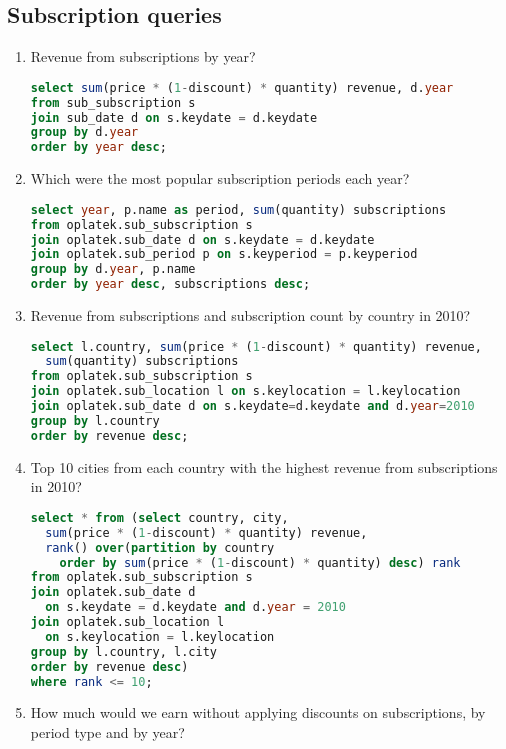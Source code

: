 \subsection*{Subscription queries} %
\label{sub:Subscription business queries}
\begin{enumerate}
  \item Revenue from subscriptions by year?
\begin{lstlisting}[language=sql]
select sum(price * (1-discount) * quantity) revenue, d.year 
from sub_subscription s 
join sub_date d on s.keydate = d.keydate 
group by d.year 
order by year desc;
\end{lstlisting}
  \item Which were the most popular subscription periods each year?
\begin{lstlisting}[language=sql]
select year, p.name as period, sum(quantity) subscriptions
from oplatek.sub_subscription s 
join oplatek.sub_date d on s.keydate = d.keydate
join oplatek.sub_period p on s.keyperiod = p.keyperiod 
group by d.year, p.name
order by year desc, subscriptions desc;
\end{lstlisting}
  \item Revenue from subscriptions and subscription count by country in 2010?
\begin{lstlisting}[language=sql]
select l.country, sum(price * (1-discount) * quantity) revenue, 
  sum(quantity) subscriptions 
from oplatek.sub_subscription s 
join oplatek.sub_location l on s.keylocation = l.keylocation 
join oplatek.sub_date d on s.keydate=d.keydate and d.year=2010
group by l.country 
order by revenue desc;
\end{lstlisting}
  \item Top 10 cities from each country with the highest revenue from subscriptions in 2010?
\begin{lstlisting}[language=sql]  
select * from (select country, city, 
  sum(price * (1-discount) * quantity) revenue, 
  rank() over(partition by country 
    order by sum(price * (1-discount) * quantity) desc) rank 
from oplatek.sub_subscription s 
join oplatek.sub_date d 
  on s.keydate = d.keydate and d.year = 2010
join oplatek.sub_location l 
  on s.keylocation = l.keylocation
group by l.country, l.city
order by revenue desc)
where rank <= 10;
\end{lstlisting}
  \item How much would we earn without applying discounts on subscriptions, by period type and by year?
\begin{lstlisting}[language=sql] 

\end{lstlisting}
\end{enumerate}
